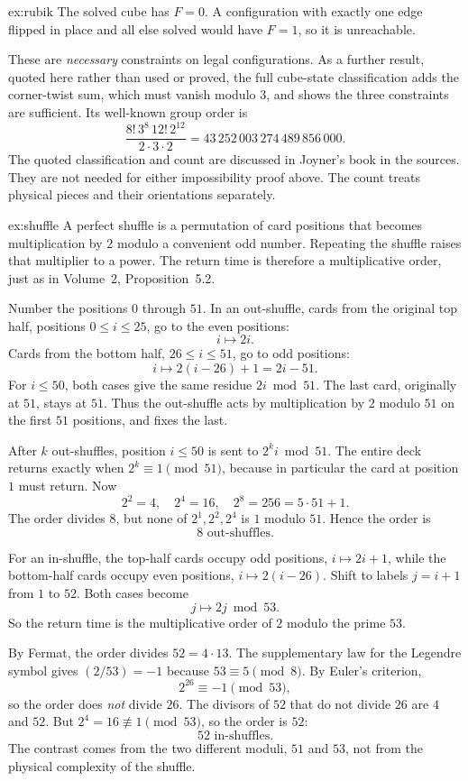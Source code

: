 \begin{solution}{ex:rubik}
The solved cube has $F=0$. A configuration with exactly one edge flipped in place and all else solved would have $F=1$, so it is unreachable.

These are \emph{necessary} constraints on legal configurations. As a further result, quoted here rather than used or proved, the full cube-state classification adds the corner-twist sum, which must vanish modulo $3$, and shows the three constraints are sufficient. Its well-known group order is
\[
\frac{8!\,3^8\,12!\,2^{12}}{2\cdot3\cdot2}
=43\,252\,003\,274\,489\,856\,000.
\]
The quoted classification and count are discussed in Joyner's book in the sources. They are not needed for either impossibility proof above. The count treats physical pieces and their orientations separately.
\end{solution}

\begin{solution}{ex:shuffle}
\idea A perfect shuffle is a permutation of card positions that becomes multiplication by $2$ modulo a convenient odd number. Repeating the shuffle raises that multiplier to a power. The return time is therefore a multiplicative order, just as in Volume~2, Proposition~5.2.

\writeup Number the positions $0$ through $51$. In an out-shuffle, cards from the original top half, positions $0\le i\le25$, go to the even positions:
\[
i\longmapsto2i.
\]
Cards from the bottom half, $26\le i\le51$, go to odd positions:
\[
i\longmapsto2(i-26)+1=2i-51.
\]
For $i\le50$, both cases give the same residue $2i\bmod51$. The last card, originally at $51$, stays at $51$. Thus the out-shuffle acts by multiplication by $2$ modulo $51$ on the first $51$ positions, and fixes the last.

After $k$ out-shuffles, position $i\le50$ is sent to $2^ki\bmod51$. The entire deck returns exactly when $2^k\equiv1\pmod{51}$, because in particular the card at position $1$ must return. Now
\[
2^2=4,\quad2^4=16,\quad 2^8=256=5\cdot51+1.
\]
The order divides $8$, but none of $2^1,2^2,2^4$ is $1$ modulo $51$. Hence the order is
\[
\boxed{8\text{ out-shuffles}}.
\]

For an in-shuffle, the top-half cards occupy odd positions, $i\mapsto2i+1$, while the bottom-half cards occupy even positions, $i\mapsto2(i-26)$. Shift to labels $j=i+1$ from $1$ to $52$. Both cases become
\[
j\longmapsto 2j\bmod53.
\]
So the return time is the multiplicative order of $2$ modulo the prime $53$.

By Fermat, the order divides $52=4\cdot13$. The supplementary law for the Legendre symbol gives $(2/53)=-1$ because $53\equiv5\pmod8$. By Euler's criterion,
\[
2^{26}\equiv-1\pmod{53},
\]
so the order does \emph{not} divide $26$. The divisors of $52$ that do not divide $26$ are $4$ and $52$. But $2^4=16\not\equiv1\pmod{53}$, so the order is $52$:
\[
\boxed{52\text{ in-shuffles}}.
\]
The contrast comes from the two different moduli, $51$ and $53$, not from the physical complexity of the shuffle.
\end{solution}

